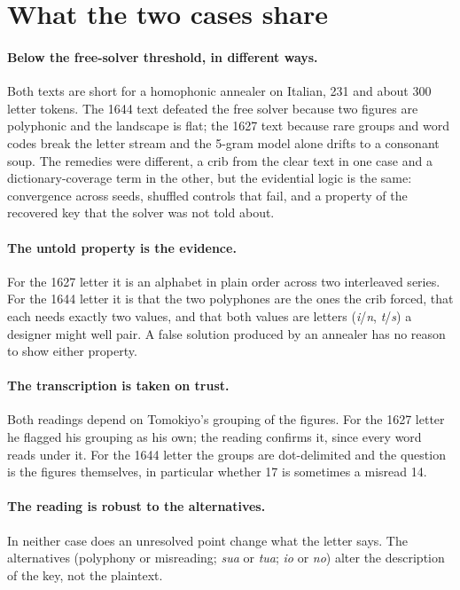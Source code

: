 \documentclass[11pt]{article}
\begin{document}
\section{What the two cases share}\label{sec:discussion}

\paragraph{Below the free-solver threshold, in different ways.} Both texts are short for a homophonic annealer on Italian, 231 and about 300 letter tokens. The 1644 text defeated the free solver because two figures are polyphonic and the landscape is flat; the 1627 text because rare groups and word codes break the letter stream and the 5-gram model alone drifts to a consonant soup. The remedies were different, a crib from the clear text in one case and a dictionary-coverage term in the other, but the evidential logic is the same: convergence across seeds, shuffled controls that fail, and a property of the recovered key that the solver was not told about.

\paragraph{The untold property is the evidence.} For the 1627 letter it is an alphabet in plain order across two interleaved series. For the 1644 letter it is that the two polyphones are the ones the crib forced, that each needs exactly two values, and that both values are letters (\emph{i}/\emph{n}, \emph{t}/\emph{s}) a designer might well pair. A false solution produced by an annealer has no reason to show either property.

\paragraph{The transcription is taken on trust.} Both readings depend on Tomokiyo's grouping of the figures. For the 1627 letter he flagged his grouping as his own; the reading confirms it, since every word reads under it. For the 1644 letter the groups are dot-delimited and the question is the figures themselves, in particular whether 17 is sometimes a misread 14.

\paragraph{The reading is robust to the alternatives.} In neither case does an unresolved point change what the letter says. The alternatives (polyphony or misreading; \emph{sua} or \emph{tua}; \emph{io} or \emph{no}) alter the description of the key, not the plaintext.
\end{document}
